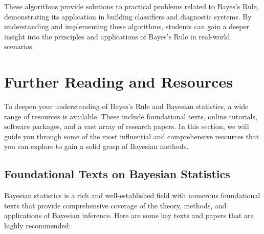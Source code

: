 \documentclass[12pt]{book} %
\begin{document}
These algorithms provide solutions to practical problems related to Bayes's Rule, demonstrating its application in building classifiers and diagnostic systems. By understanding and implementing these algorithms, students can gain a deeper insight into the principles and applications of Bayes's Rule in real-world scenarios.


\section{Further Reading and Resources}
To deepen your understanding of Bayes's Rule and Bayesian statistics, a wide range of resources is available. These include foundational texts, online tutorials, software packages, and a vast array of research papers. In this section, we will guide you through some of the most influential and comprehensive resources that you can explore to gain a solid grasp of Bayesian methods.

\subsection{Foundational Texts on Bayesian Statistics}
Bayesian statistics is a rich and well-established field with numerous foundational texts that provide comprehensive coverage of the theory, methods, and applications of Bayesian inference. Here are some key texts and papers that are highly recommended:
\end{document}
